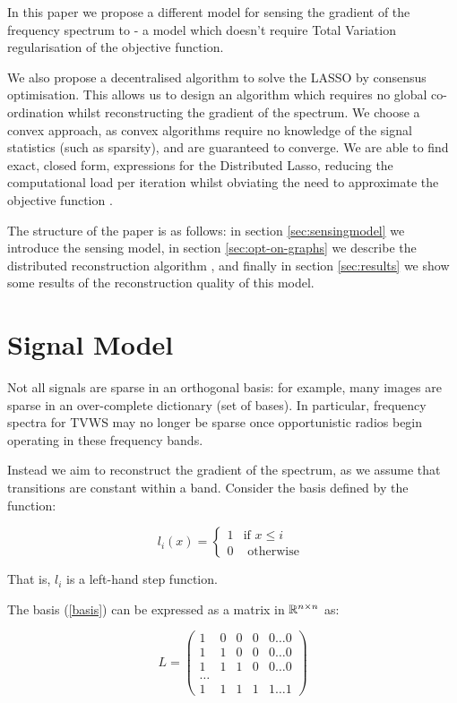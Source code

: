 \documentclass[conference]{IEEEtran}
\begin{document}
In this paper we propose a different model for sensing the gradient of the frequency spectrum to \cite{tian2006wavelet} - a model which doesn't require Total Variation regularisation of the objective function. 

We also propose a decentralised algorithm to solve the LASSO by consensus optimisation. This allows us to design an algorithm which requires no global co-ordination whilst reconstructing the gradient of the spectrum. We choose a convex approach, as convex algorithms require no knowledge of the signal statistics (such as sparsity), and are guaranteed to converge. We are able to find exact, closed form, expressions for the Distributed Lasso, reducing the computational load per iteration whilst obviating the need to approximate the objective function \cite{ling2014dlm}.

The structure of the paper is as follows: in section \ref{sec:sensingmodel} we introduce the sensing model, in section \ref{sec:opt-on-graphs} we describe the distributed reconstruction algorithm \cite{mota2013d}, and finally in section \ref{sec:results} we show some results of the reconstruction quality of this model. 

\section{Signal Model}

Not all signals are sparse in an orthogonal basis: for example, many images are sparse in an over-complete dictionary (set of bases). In particular, frequency spectra for TVWS may no longer be sparse once opportunistic radios begin operating in these frequency bands. 

Instead we aim to reconstruct the gradient of the spectrum, as we assume that transitions are constant within a band. Consider the basis defined by the function:

\begin{equation}
l_i\left(x\right) =
\begin{cases}
1 & \text{if } x \leq i \\
0 & \text{ otherwise } 
\end{cases}
\label{basis}
\end{equation}

That is, \(l_i\) is a left-hand step function. 

The basis (\ref{basis}) can be expressed as a matrix in \({\mathbb{R}}^{n \times n}\) as:

\begin{equation}
L = \begin{pmatrix}
 1 & 0 & 0 & 0  & 0 \ldots 0 \\
  1 & 1 & 0 & 0  & 0 \ldots 0\\
     1 & 1 & 1 & 0  & 0 \ldots0  \\
    \ldots  \\
     1 & 1 & 1 & 1  & 1 \ldots 1 
\end{pmatrix}
\end{equation}
\end{document}
